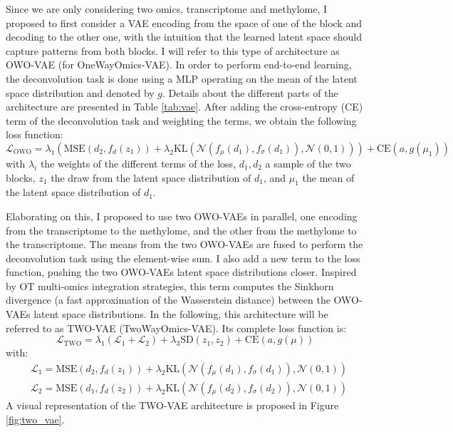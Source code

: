 \documentclass{article}
\begin{document}
Since we are only considering two omics, transcriptome and methylome, I proposed to first consider a VAE encoding from the space of one of the block and decoding to the other one, with the intuition that the learned latent space should capture patterns from both blocks.
I will refer to this type of architecture as OWO-VAE (for OneWayOmics-VAE).
In order to perform end-to-end learning, the deconvolution task is done using a MLP operating on the mean of the latent space distribution and denoted by $g$.
Details about the different parts of the architecture are presented in Table \ref{tab:vae}.
After adding the cross-entropy (CE) term of the deconvolution task and weighting the terms, we obtain the following loss function:
$$
\mathcal{L}_\text{OWO} = \lambda_1 (\text{MSE}(d_2, f_d(z_1)) + \lambda_2 \text{KL}(\mathcal{N}(f_\mu(d_1), f_\sigma(d_1)), \mathcal{N}(0, 1))) + \text{CE}(a, g(\mu_1))
$$
with $\lambda_i$ the weights of the different terms of the loss, $d_1, d_2$ a sample of the two blocks, $z_1$ the draw from the latent space distribution of $d_1$, and $\mu_1$ the mean of the latent space distribution of $d_1$.



Elaborating on this, I proposed to use two OWO-VAEs in parallel, one encoding from the transcriptome to the methylome, and the other from the methylome to the transcriptome.
The means from the two OWO-VAEs are fused to perform the deconvolution task using the element-wise sum.
I also add a new term to the loss function, pushing the two OWO-VAEs latent space distributions closer.
Inspired by OT multi-omics integration strategies, this term computes the Sinkhorn divergence \cite{cuturi_2013_sinkhorn, feydy_2019_interpolating} (a fast approximation of the Wasserstein distance) between the OWO-VAEs latent space distributions.
In the following, this architecture will be referred to as TWO-VAE (TwoWayOmics-VAE).
Its complete loss function is:
$$
\mathcal{L}_\text{TWO} = \lambda_1 (\mathcal{L}_1  + \mathcal{L}_2) + \lambda_3 \text{SD}(z_1, z_2) + \text{CE}(a, g(\mu))
$$
with:
\begin{equation*}
\begin{split}
    & \mathcal{L}_1 = \text{MSE}(d_2, f_d(z_1)) + \lambda_2 \text{KL}(\mathcal{N}(f_\mu(d_1), f_\sigma(d_1)), \mathcal{N}(0, 1)) \\
    & \mathcal{L}_2 = \text{MSE}(d_1, f_d(z_2)) + \lambda_2 \text{KL}(\mathcal{N}(f_\mu(d_2), f_\sigma(d_2)), \mathcal{N}(0, 1))
\end{split}
\end{equation*}
A visual representation of the TWO-VAE architecture is proposed in Figure \ref{fig:two_vae}.
\end{document}
